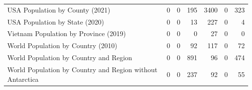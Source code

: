 \begin{tabular}{lrrr|rrr}
                          USA Population by County (2021) &                           0 &                           0 &                            195 &                           3400 &                              0 &                               323 \\
                           USA Population by State (2020) &                           0 &                           0 &                             13 &                            227 &                              0 &                                 4 \\
                    Vietnam Population by Province (2019) &                           0 &                           0 &                              0 &                             27 &                              0 &                                 0 \\
                       World Population by Country (2010) &                           0 &                           0 &                             92 &                            117 &                              0 &                                72 \\
                   World Population by Country and Region &                           0 &                           0 &                            891 &                             96 &                              0 &                               474 \\
World Population by Country and Region without Antarctica &                           0 &                           0 &                            237 &                             92 &                              0 &                                55 \\
\bottomrule
\end{tabular}

